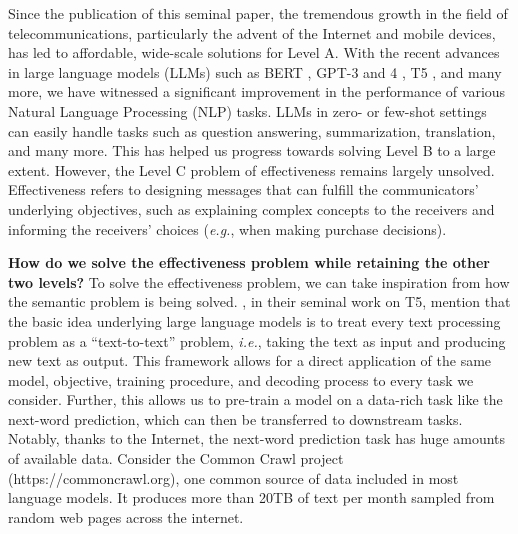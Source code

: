 Since the publication of this seminal paper, the tremendous growth in the field of telecommunications, particularly the advent of the Internet and mobile devices, has led to affordable, wide-scale solutions for Level A.
With the recent advances in large language models (LLMs) such as BERT \citep{devlin2018bert}, GPT-3 and 4 \citep{brown2020language,openai2023gpt4}, T5 \citep{raffel2020exploring}, and many more, we have witnessed a significant improvement in the performance of various Natural Language Processing (NLP) tasks. LLMs in zero- or few-shot settings can easily handle tasks such as question answering, summarization, translation, and many more. This has helped us progress towards solving Level B to a large extent. However, the Level C problem of effectiveness remains largely unsolved. Effectiveness refers to designing messages that can fulfill the communicators' underlying objectives, such as explaining complex concepts to the receivers and informing the receivers' choices (\textit{e.g.}, when making purchase decisions).


\textbf{How do we solve the effectiveness problem while retaining the other two levels?} To solve the effectiveness problem, we can take inspiration from how the semantic problem is being solved. \citet{raffel2020exploring}, in their seminal work on T5, mention that the basic idea underlying large language models is to treat every text processing problem as a ``text-to-text'' problem, \textit{i.e.}, taking the text as input and producing new text as output. This framework allows for a direct application of the same model, objective, training procedure, and decoding process to every task we consider. Further, this allows us to pre-train a model on a data-rich task like the next-word prediction, which can then be transferred to downstream tasks. Notably, thanks to the Internet, the next-word prediction task has huge amounts of available data. Consider the Common Crawl project (https://commoncrawl.org), one common source of data included in most language models. It produces more than 20TB of text per month sampled from random web pages across the internet. 






